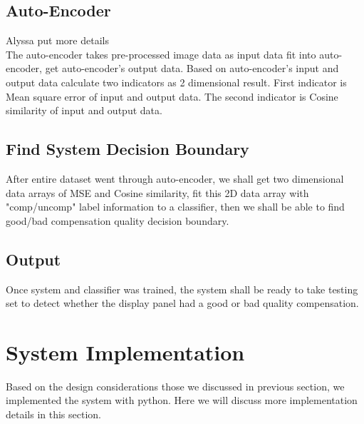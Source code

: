 \documentclass[runningheads]{llncs}
\begin{document}
\subsection{Auto-Encoder}
Alyssa put more details\\
The auto-encoder takes pre-processed image data as input data fit into auto-encoder, get auto-encoder's output data. Based on auto-encoder's input and output data calculate two indicators as 2 dimensional result.
First indicator is Mean square error of input and output data. The second indicator is Cosine similarity of input and output data. \\
\subsection{Find System Decision Boundary}
After entire dataset went through auto-encoder, we shall get two dimensional data arrays of MSE and Cosine similarity, fit this 2D data array with "comp/uncomp" label information to a classifier, then we shall be able to find good/bad compensation quality decision boundary.
\subsection{Output}
Once system and classifier was trained, the system shall be ready to take testing set to detect whether the display panel had a good or bad quality compensation.

\section{System Implementation}
Based on the design considerations those we discussed in previous section, we implemented the system with python. Here we will discuss more implementation details in this section.
\end{document}
